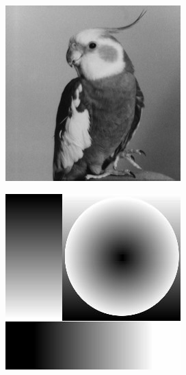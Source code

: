         \begin{figure}[H]
            \centering
                \begin{subfigure}[b]{0.15\textwidth}
                    \centering
                    \includegraphics[width=\textwidth]{images/bird.jpg}
                    \caption{}
                    \label{fig:waterloo-bird}
                \end{subfigure}
                \hfill
                \begin{subfigure}[b]{0.15\textwidth}
                    \centering
                    \includegraphics[width=\textwidth]{images/slop.jpg}

\end{subfigure}
\end{figure}
